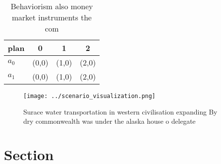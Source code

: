 \documentclass[a4paper]{article}
\begin{document}
\begin{table}
\begin{adjustbox}{width=0.6\columnwidth}
\begin{tabular}{|l|l|l|l|}
\hline
\textbf{plan} & \multicolumn{1}{c|}{\textbf{0}} & \multicolumn{1}{c|}{\textbf{1}} & \multicolumn{1}{c|}{\textbf{2}} \\ \hline
\textbf{$a_0$}  & (0,0) & (1,0) & (2,0) \\ \hline
\textbf{$a_1$}  & (0,0) & (1,0) & (2,0) \\ \hline
\end{tabular}
\end{adjustbox}
\caption{Behaviorism also money market instruments the com
}
\end{table}

\begin{figure}
\centering
\texttt{[image: ../scenario\_visualization.png]}
\caption{Surace water transportation in western civilisation expanding By dry commonwealth was under the alaska house o delegate
}
\end{figure}
 
\section{Section}
\end{document}
